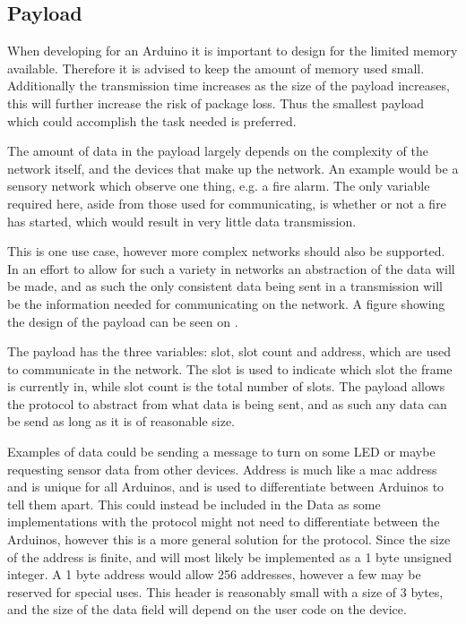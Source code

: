 \subsection{Payload}
When developing for an Arduino it is important to design for the limited memory available.
Therefore it is advised to keep the amount of memory used small.
Additionally the transmission time increases as the size of the payload increases, this will further increase the risk of package loss. 
Thus the smallest payload which could accomplish the task needed is preferred.
 
The amount of data in the payload largely depends on the complexity of the network itself, and the devices that make up the network.
An example would be a sensory network which observe one thing, e.g. a fire alarm. 
The only variable required here, aside from those used for communicating, is whether or not a fire has started, which would result in very little data transmission.

This is one use case, however more complex networks should also be supported. 
In an effort to allow for such a variety in networks an abstraction of the data will be made, and as such the only consistent data being sent in a transmission will be the information needed for communicating on the network.
A figure showing the design of the payload can be seen on .


\noindent%
The payload has the three variables: slot, slot count and address, which are used to communicate in the network.
The slot is used to indicate which slot the frame is currently in, while slot count is the total number of slots.
The payload allows the protocol to abstract from what data is being sent, and as such any data can be send as long as it is of reasonable size. 

Examples of data could be sending a message to turn on some LED or maybe requesting sensor data from other devices.
Address is much like a mac address and is unique for all Arduinos, and is used to differentiate between Arduinos to tell them apart.
This could instead be included in the Data as some implementations with the protocol might not need to differentiate between the Arduinos, however this is a more general solution for the protocol.
Since the size of the address is finite, and will most likely be implemented as a 1 byte unsigned integer. 
A 1 byte address would allow 256 addresses, however a few may be reserved for special uses.
This header is reasonably small with a size of 3 bytes, and the size of the data field will depend on the user code on the device.
